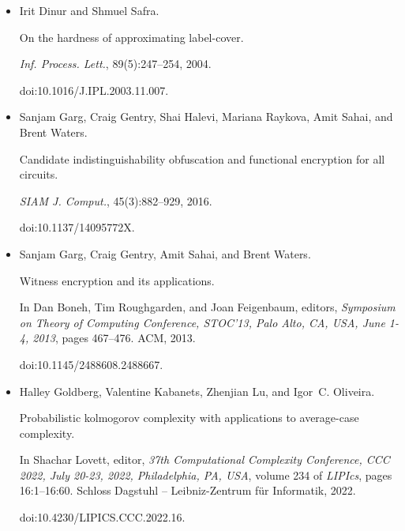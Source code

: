 \documentclass[10pt,a4paper]{article}
\begin{document}
\begin{itemize}
doi:10.1145/2746539.2746630.





\item[] 
[9]

Irit Dinur and Shmuel Safra.


On the hardness of approximating label-cover.


\emph{Inf. Process. Lett.}, 89(5):247–254, 2004.


doi:10.1016/J.IPL.2003.11.007.





\item[] 
[10]

Sanjam Garg, Craig Gentry, Shai Halevi, Mariana Raykova, Amit Sahai, and Brent
Waters.


Candidate indistinguishability obfuscation and functional encryption
for all circuits.


\emph{SIAM J. Comput.}, 45(3):882–929, 2016.


doi:10.1137/14095772X.





\item[] 
[11]

Sanjam Garg, Craig Gentry, Amit Sahai, and Brent Waters.


Witness encryption and its applications.


In Dan Boneh, Tim Roughgarden, and Joan Feigenbaum, editors, \emph{Symposium on Theory of Computing Conference, STOC’13, Palo Alto, CA, USA,
June 1-4, 2013}, pages 467–476. ACM, 2013.


doi:10.1145/2488608.2488667.





\item[] 
[12]

Halley Goldberg, Valentine Kabanets, Zhenjian Lu, and Igor C. Oliveira.


Probabilistic kolmogorov complexity with applications to average-case
complexity.


In Shachar Lovett, editor, \emph{37th Computational Complexity
Conference, CCC 2022, July 20-23, 2022, Philadelphia, PA, USA}, volume
234 of \emph{LIPIcs}, pages 16:1–16:60. Schloss Dagstuhl – Leibniz-Zentrum
für Informatik, 2022.


doi:10.4230/LIPICS.CCC.2022.16.






\end{itemize}
\end{document}
